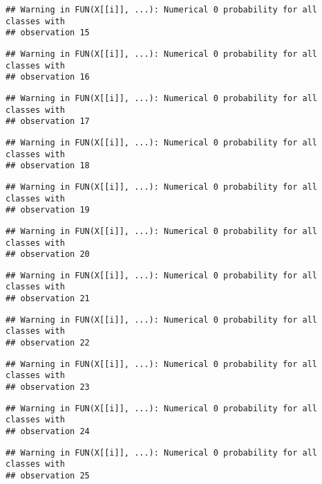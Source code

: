\documentclass[
]{article}
\begin{document}
\begin{verbatim}
## Warning in FUN(X[[i]], ...): Numerical 0 probability for all classes with
## observation 15
\end{verbatim}

\begin{verbatim}
## Warning in FUN(X[[i]], ...): Numerical 0 probability for all classes with
## observation 16
\end{verbatim}

\begin{verbatim}
## Warning in FUN(X[[i]], ...): Numerical 0 probability for all classes with
## observation 17
\end{verbatim}

\begin{verbatim}
## Warning in FUN(X[[i]], ...): Numerical 0 probability for all classes with
## observation 18
\end{verbatim}

\begin{verbatim}
## Warning in FUN(X[[i]], ...): Numerical 0 probability for all classes with
## observation 19
\end{verbatim}

\begin{verbatim}
## Warning in FUN(X[[i]], ...): Numerical 0 probability for all classes with
## observation 20
\end{verbatim}

\begin{verbatim}
## Warning in FUN(X[[i]], ...): Numerical 0 probability for all classes with
## observation 21
\end{verbatim}

\begin{verbatim}
## Warning in FUN(X[[i]], ...): Numerical 0 probability for all classes with
## observation 22
\end{verbatim}

\begin{verbatim}
## Warning in FUN(X[[i]], ...): Numerical 0 probability for all classes with
## observation 23
\end{verbatim}

\begin{verbatim}
## Warning in FUN(X[[i]], ...): Numerical 0 probability for all classes with
## observation 24
\end{verbatim}

\begin{verbatim}
## Warning in FUN(X[[i]], ...): Numerical 0 probability for all classes with
## observation 25
\end{verbatim}
\end{document}
